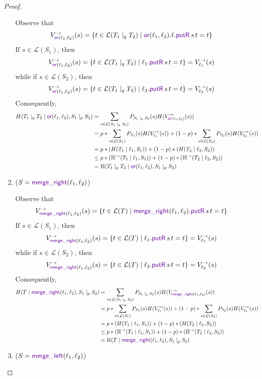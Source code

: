 \documentclass[acmsmall,screen,anonymous]{acmart}
\begin{document}
\begin{proof}
\begin{enumerate}
Observe that 
$$
V^{\rightarrow}_{ \OrLensOf{\Lens_1}{\Lens_2}}(s) = \{t \in \mathcal{L}(T_1 \; |_q \; T_2) \; | \;  \OrLensOf{\Lens_1}{\Lens_2}.\ell.\PutROf{s}{t} = t\}
$$
If $s \in \mathcal{L}(S_1)$, then
$$
V^{\rightarrow}_{ \OrLensOf{\Lens_1}{\Lens_2}}(s) = \{t \in \mathcal{L}(T_1 \; |_q \; T_2) \; | \;  \ell_1.\PutROf{s}{t} = t\} = V^{\rightarrow}_{\ell_1}(s)
$$
while if $s \in \mathcal{L}(S_2)$, then
$$
V^{\rightarrow}_{ \OrLensOf{\Lens_1}{\Lens_2}}(s) = \{t \in \mathcal{L}(T_1 \; |_q \; T_2) \; | \;  \ell_2.\PutROf{s}{t} = t\} = V^{\rightarrow}_{\ell_2}(s)
$$
Consequently,
\begin{align*}
H(T_1 \; |_q \; T_2 \; | \; \OrLensOf{\Lens_1}{\Lens_2}, S_1 \; |_p \; S_2) &= \sum_{s \in \mathcal{L}(S_1 \; |_p \; S_2)}P_{S_1 \; |_p \; S_2}(s) H(V^{\rightarrow}_{\OrLensOf{\Lens_1}{\Lens_2}}(s))\\
&= p * \sum_{s \in \mathcal{L}(S_1)}P_{S_1}(s) H(V^{\rightarrow}_{\ell_1}(s)) + (1-p) * \sum_{s \in \mathcal{L}(S_2)}P_{S_2}(s) H(V^{\rightarrow}_{\ell_2}(s))\\
&= p * (H(T_1 \; | \; \ell_1,S_1)) + (1-p) * (H(T_2 \; | \; \ell_2,S_2))\\
&\leq p * (\mathbb{H}^{\rightarrow}(T_1 \; | \; \ell_1,S_1)) + (1-p) * (\mathbb{H}^{\rightarrow}(T_2 \; | \; \ell_2,S_2))\\
&= \mathbb{H}(T_1 \; |_q \; T_2 \; | \; \OrLensOf{\Lens_1}{\Lens_2}, S_1 \; |_p \; S_2) 
\end{align*}
\item
($S = \MergeROf{\Lens_1}{\Lens_2}$)

Observe that 
$$
V^{\rightarrow}_{ \MergeROf{\Lens_1}{\Lens_2}}(s) = \{t \in \mathcal{L}(T) \; | \;  \MergeROf{\Lens_1}{\Lens_2}.\PutROf{s}{t} = t\}
$$
If $s \in \mathcal{L}(S_1)$, then
$$
V^{\rightarrow}_{ \MergeROf{\Lens_1}{\Lens_2}}(s) = \{t \in \mathcal{L}(T) \; | \;  \ell_1.\PutROf{s}{t} = t\} = V^{\rightarrow}_{\ell_1}(s)
$$
while if $s \in \mathcal{L}(S_2)$, then
$$
V^{\rightarrow}_{ \MergeROf{\Lens_1}{\Lens_2}}(s) = \{t \in \mathcal{L}(T) \; | \;  \ell_2.\PutROf{s}{t} = t\} = V^{\rightarrow}_{\ell_2}(s)
$$
Consequently,
\begin{align*}
H(T \; | \; \MergeROf{\Lens_1}{\Lens_2}, S_1 \; |_p \; S_2) &= \sum_{s \in \mathcal{L}(S_1 \; |_p \; S_2)}P_{S_1 \; |_p \; S_2}(s) H(V^{\rightarrow}_{\MergeROf{\Lens_1}{\Lens_2}}(s))\\
&= p * \sum_{s \in \mathcal{L}(S_1)}P_{S_1}(s) H(V^{\rightarrow}_{\ell_1}(s)) + (1-p) * \sum_{s \in \mathcal{L}(S_2)}P_{S_2}(s) H(V^{\rightarrow}_{\ell_2}(s))\\
&= p * (H(T_1 \; | \; \ell_1, S_1) ) + (1-p) * (H(T_2 \; | \; \ell_2, S_2) )\\
&\leq p * (\mathbb{H}^{\rightarrow}(T_1 \; | \; \ell_1, S_1) ) + (1-p) * (\mathbb{H}^{\rightarrow}(T_2 \; | \; \ell_2, S_2) )\\
&= \mathbb{H}(T \; | \; \MergeROf{\Lens_1}{\Lens_2}, S_1 \; |_p \; S_2) 
\end{align*}
\item
($S = \MergeLOf{\Lens_1}{\Lens_2}$)


\end{enumerate}
\end{proof}
\end{document}
